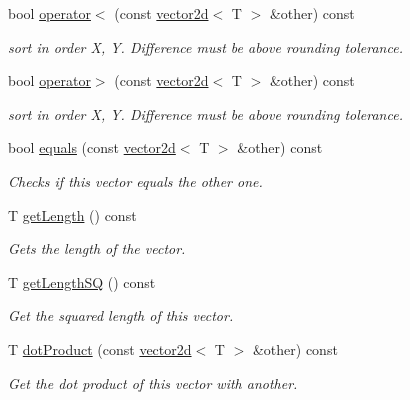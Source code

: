 \begin{DoxyCompactItemize}
\mbox{\label{classirr_1_1core_1_1vector2d_a13fb215fc9d3c6f1f43c07b1a040bd06}} 
bool \hyperlink{classirr_1_1core_1_1vector2d_a13fb215fc9d3c6f1f43c07b1a040bd06}{operator$<$} (const \hyperlink{classirr_1_1core_1_1vector2d}{vector2d}$<$ T $>$ \&other) const
\begin{DoxyCompactList}\small\item\em sort in order X, Y. Difference must be above rounding tolerance. \end{DoxyCompactList}\item 
\mbox{\label{classirr_1_1core_1_1vector2d_a744e5ad34a264a4aa490fc80313ef09f}} 
bool \hyperlink{classirr_1_1core_1_1vector2d_a744e5ad34a264a4aa490fc80313ef09f}{operator$>$} (const \hyperlink{classirr_1_1core_1_1vector2d}{vector2d}$<$ T $>$ \&other) const
\begin{DoxyCompactList}\small\item\em sort in order X, Y. Difference must be above rounding tolerance. \end{DoxyCompactList}\item 
bool \hyperlink{classirr_1_1core_1_1vector2d_a9b04601d982c880ed599b5bb16cd86a7}{equals} (const \hyperlink{classirr_1_1core_1_1vector2d}{vector2d}$<$ T $>$ \&other) const
\begin{DoxyCompactList}\small\item\em Checks if this vector equals the other one. \end{DoxyCompactList}\item 
T \hyperlink{classirr_1_1core_1_1vector2d_a84b5741d21aa24cfb71b14e350226ab9}{get\+Length} () const
\begin{DoxyCompactList}\small\item\em Gets the length of the vector. \end{DoxyCompactList}\item 
T \hyperlink{classirr_1_1core_1_1vector2d_ac08fae4770172d11cb2811f18fec2d23}{get\+Length\+SQ} () const
\begin{DoxyCompactList}\small\item\em Get the squared length of this vector. \end{DoxyCompactList}\item 
T \hyperlink{classirr_1_1core_1_1vector2d_acf2fea122833c456c6dd66811acc8b91}{dot\+Product} (const \hyperlink{classirr_1_1core_1_1vector2d}{vector2d}$<$ T $>$ \&other) const
\begin{DoxyCompactList}\small\item\em Get the dot product of this vector with another. \end{DoxyCompactList}\item 

\end{DoxyCompactItemize}
